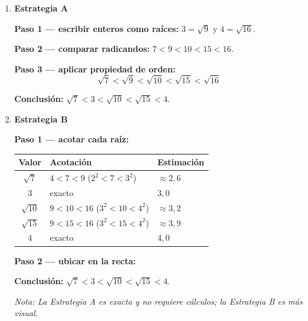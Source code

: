 \documentclass[11pt, letterpaper]{article}
\begin{document}
\begin{tcolorbox}[examplebox, title={Ejemplo — ordenar $\sqrt{10}$, $3$, $\sqrt{7}$, $4$, $\sqrt{15}$ con ambas estrategias}]
\begin{enumerate}[label=\textbf{Ej. \arabic*.}, leftmargin=*, itemsep=16pt]

\item \textbf{Estrategia A}

\textbf{Paso 1 — escribir enteros como raíces:} $3=\sqrt{9}$ y $4=\sqrt{16}$.

\textbf{Paso 2 — comparar radicandos:} $7 < 9 < 10 < 15 < 16$.

\textbf{Paso 3 — aplicar propiedad de orden:}
$$\sqrt{7} < \sqrt{9} < \sqrt{10} < \sqrt{15} < \sqrt{16}$$

\textbf{Conclusión:} $\sqrt{7} < 3 < \sqrt{10} < \sqrt{15} < 4$.

\item \textbf{Estrategia B}

\textbf{Paso 1 — acotar cada raíz:}

\begin{center}
\renewcommand{\arraystretch}{1.25}
\begin{tabular}{c l l}
\toprule
\textbf{Valor} & \textbf{Acotación} & \textbf{Estimación}\\
\midrule
$\sqrt{7}$  & $4<7<9$ \quad ($2^2<7<3^2$) & $\approx 2{,}6$\\
$3$         & exacto & $3{,}0$\\
$\sqrt{10}$ & $9<10<16$ \quad ($3^2<10<4^2$) & $\approx 3{,}2$\\
$\sqrt{15}$ & $9<15<16$ \quad ($3^2<15<4^2$) & $\approx 3{,}9$\\
$4$         & exacto & $4{,}0$\\
\bottomrule
\end{tabular}
\end{center}

\textbf{Paso 2 — ubicar en la recta:}

\begin{center}
\end{center}

\textbf{Conclusión:} $\sqrt{7} < 3 < \sqrt{10} < \sqrt{15} < 4$.

\medskip
\textit{Nota: La Estrategia A es exacta y no requiere cálculos; la Estrategia B es más visual.}

\end{enumerate}
\end{tcolorbox}
\end{document}
